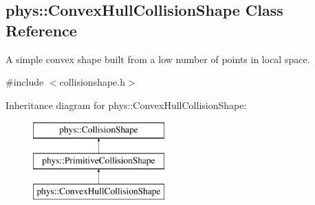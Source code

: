 \hypertarget{classphys_1_1ConvexHullCollisionShape}{
\subsection{phys::ConvexHullCollisionShape Class Reference}
\label{classphys_1_1ConvexHullCollisionShape}
}


A simple convex shape built from a low number of points in local space.  




{\ttfamily \#include $<$collisionshape.h$>$}

Inheritance diagram for phys::ConvexHullCollisionShape:\begin{figure}[H]
\begin{center}
\leavevmode
\includegraphics[height=3.000000cm]{classphys_1_1ConvexHullCollisionShape}
\end{center}
\end{figure}
